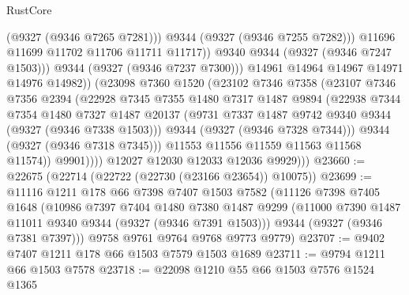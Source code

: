\begin{lexlean}{RustCore}
\begin{coremodule}
                                (@9327 (@9346 @7265 @7281)))
                              @9344
                              (@9327 (@9346 @7255 @7282)))
                            @11696
                            @11699
                            @11702
                            @11706
                            @11711
                            @11717))
                        @9340
                        @9344
                        (@9327 (@9346 @7247 @1503)))
                      @9344
                      (@9327 (@9346 @7237 @7300)))
                    @14961
                    @14964
                    @14967
                    @14971
                    @14976
                    @14982))
                (@23098
                  @7360
                  @1520
                  (@23102
                    @7346
                    @7358
                    (@23107
                      @7346
                      @7356
                      @2394
                      (@22928
                        @7345
                        @7355
                        @1480
                        @7317
                        @1487
                        @9894
                        (@22938
                          @7344
                          @7354
                          @1480
                          @7327
                          @1487
                          @20137
                          (@9731 @7337 @1487 @9742 @9340 @9344 (@9327 (@9346 @7338 @1503)))
                          @9344
                          (@9327 (@9346 @7328 @7344)))
                        @9344
                        (@9327 (@9346 @7318 @7345)))
                      @11553
                      @11556
                      @11559
                      @11563
                      @11568
                      @11574))
                  @9901))))
          @12027
          @12030
          @12033
          @12036
          @9929)))
@23660 := @22675 (@22714 (@22722 (@22730 (@23166 @23654)) @10075))
@23699 := @11116
    @1211
    @178
    @66
    @7398
    @7407
    @1503
    @7582
    (@11126
      @7398
      @7405
      @1648
      (@10986
        @7397
        @7404
        @1480
        @7380
        @1487
        @9299
        (@11000 @7390 @1487 @11011 @9340 @9344 (@9327 (@9346 @7391 @1503)))
        @9344
        (@9327 (@9346 @7381 @7397)))
      @9758
      @9761
      @9764
      @9768
      @9773
      @9779)
@23707 := @9402 @7407 @1211 @178 @66 @1503 @7579 @1503 @1689
@23711 := @9794 @1211 @66 @1503 @7578
@23718 := @22098 @1210 @55 @66 @1503 @7576 @1524 @1365

\end{coremodule}
\end{lexlean}
